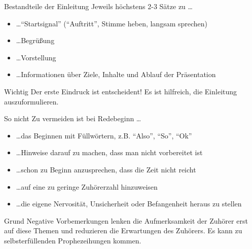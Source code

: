 \begin{frame}{Bestandteile der Einleitung}
    Jeweils höchstens 2-3 Sätze zu \dots
    \begin{itemize}[<+->]
        \item \dots "`Startsignal"' ("`Auftritt"', Stimme heben, langsam sprechen)
        \item \dots Begrüßung
        \item \dots Vorstellung
        \item \dots Informationen über Ziele, Inhalte und Ablauf der Präsentation
    \end{itemize}

    \pause[\thebeamerpauses]
    \begin{alertblock}{Wichtig}
        Der erste Eindruck ist entscheident! Es ist hilfreich, die
        Einleitung auszuformulieren.
    \end{alertblock}
\end{frame}

\begin{frame}{So nicht}
    Zu vermeiden ist bei Redebeginn \dots
    \begin{itemize}[<+->]
        \item \dots das Beginnen mit Füllwörtern, z.B. "`Also"', "`So"', "`Ok"'
        \item \dots Hinweise darauf zu machen, dass man nicht vorbereitet ist
        \item \dots schon zu Beginn anzusprechen, dass die Zeit nicht reicht
        \item \dots auf eine zu geringe Zuhörerzahl hinzuweisen
        \item \dots die eigene Nervosität, Unsicherheit oder Befangenheit heraus zu stellen
    \end{itemize}

    \pause[\thebeamerpauses]
    \begin{block}{Grund}
        Negative Vorbemerkungen lenken die Aufmerksamkeit der
        Zuhörer erst auf diese Themen und reduzieren die Erwartungen
        des Zuhörers. Es kann zu selbsterfüllenden Prophezeihungen
        kommen.
    \end{block}
\end{frame}

